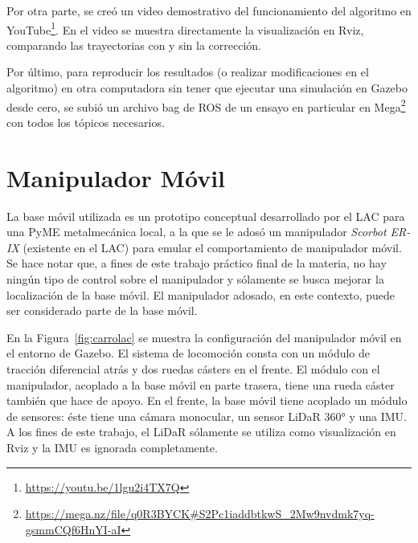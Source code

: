 \documentclass[12pt, a4paper]{report}
\begin{document}
			Por otra parte, se creó un video demostrativo del funcionamiento del algoritmo en YouTube\footnote{\url{https://youtu.be/1lgu2i4TX7Q}}.
			En el video se muestra directamente la visualización en Rviz, comparando las trayectorias con y sin la corrección.

			Por último, para reproducir los resultados (o realizar modificaciones en el algoritmo) en otra computadora sin tener que ejecutar una simulación en Gazebo desde cero, se subió un archivo bag de ROS de un ensayo en particular en Mega\footnote{\url{https://mega.nz/file/q0R3BYCK#S2Pc1iaddbtkwS_2Mw9nvdmk7yq-gsmmCQf6HnYI-aI}} con todos los tópicos necesarios.

		\section{Manipulador Móvil}\label{sec:manipulador-movil}
			La base móvil utilizada es un prototipo conceptual desarrollado por el LAC para una PyME metalmecánica local, a la que se le adosó un manipulador \emph{Scorbot ER-IX} (existente en el LAC) para emular el comportamiento de manipulador móvil.
			Se hace notar que, a fines de este trabajo práctico final de la materia, no hay ningún tipo de control sobre el manipulador y sólamente se busca mejorar la localización de la base móvil.
			El manipulador adosado, en este contexto, puede ser considerado parte de la base móvil.

			En la Figura~\ref{fig:carrolac} se muestra la configuración del manipulador móvil en el entorno de Gazebo.
			El sistema de locomoción consta con un módulo de tracción diferencial atrás y dos ruedas cásters en el frente.
			El módulo con el manipulador, acoplado a la base móvil en parte trasera, tiene una rueda cáster también que hace de apoyo.
			En el frente, la base móvil tiene acoplado un módulo de sensores: éste tiene una cámara monocular, un sensor LiDaR 360° y una IMU.
			A los fines de este trabajo, el LiDaR sólamente se utiliza como visualización en Rviz y la IMU es ignorada completamente.
		
\end{document}
